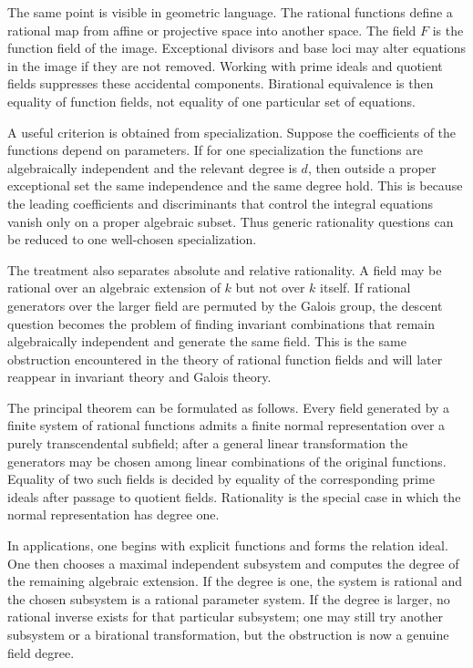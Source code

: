 \documentclass[12pt]{article}
\begin{document}
The same point is visible in geometric language. The rational functions define a rational map from
affine or projective space into another space. The field \(F\) is the function field of the image.
Exceptional divisors and base loci may alter equations in the image if they are not removed. Working
with prime ideals and quotient fields suppresses these accidental components. Birational equivalence
is then equality of function fields, not equality of one particular set of equations.


A useful criterion is obtained from specialization. Suppose the coefficients of the functions depend
on parameters. If for one specialization the functions are algebraically independent and the
relevant degree is \(d\), then outside a proper exceptional set the same independence and the same
degree hold. This is because the leading coefficients and discriminants that control the integral
equations vanish only on a proper algebraic subset. Thus generic rationality questions can be
reduced to one well-chosen specialization.


The treatment also separates absolute and relative rationality. A field may be rational over an
algebraic extension of \(k\) but not over \(k\) itself. If rational generators over the larger field
are permuted by the Galois group, the descent question becomes the problem of finding invariant
combinations that remain algebraically independent and generate the same field. This is the same
obstruction encountered in the theory of rational function fields and will later reappear in
invariant theory and Galois theory.


The principal theorem can be formulated as follows. Every field generated by a finite system of
rational functions admits a finite normal representation over a purely transcendental subfield;
after a general linear transformation the generators may be chosen among linear combinations of the
original functions. Equality of two such fields is decided by equality of the corresponding prime
ideals after passage to quotient fields. Rationality is the special case in which the normal
representation has degree one.


In applications, one begins with explicit functions and forms the relation ideal. One then chooses a
maximal independent subsystem and computes the degree of the remaining algebraic extension. If the
degree is one, the system is rational and the chosen subsystem is a rational parameter system. If
the degree is larger, no rational inverse exists for that particular subsystem; one may still try
another subsystem or a birational transformation, but the obstruction is now a genuine field degree.
\end{document}
